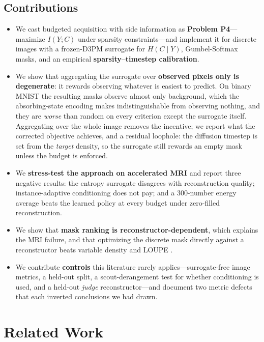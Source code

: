 \documentclass{article}
\begin{document}
\subsection{Contributions}
\begin{itemize}
\item We cast budgeted acquisition with side information as \textbf{Problem P4}---maximize $I(Y;C)$ under sparsity constraints---and implement it for discrete images with a frozen-D3PM surrogate for $H(C \mid Y)$, Gumbel-Softmax masks, and an empirical \textbf{sparsity--timestep calibration}.
\item We show that aggregating the surrogate over \textbf{observed pixels only is degenerate}: it rewards observing whatever is easiest to predict. On binary MNIST the resulting masks observe almost only background, which the absorbing-state encoding makes indistinguishable from observing nothing, and they are \emph{worse} than random on every criterion except the surrogate itself. Aggregating over the whole image removes the incentive; we report what the corrected objective achieves, and a residual loophole: the diffusion timestep is set from the \emph{target} density, so the surrogate still rewards an empty mask unless the budget is enforced.
\item We \textbf{stress-test the approach on accelerated MRI} and report three negative results: the entropy surrogate disagrees with reconstruction quality; instance-adaptive conditioning does not pay; and a 300-number energy average beats the learned policy at every budget under zero-filled reconstruction.
\item We show that \textbf{mask ranking is reconstructor-dependent}, which explains the MRI failure, and that optimizing the discrete mask directly against a reconstructor beats variable density and LOUPE \citep{bahadir2020loupe}.
\item We contribute \textbf{controls} this literature rarely applies---surrogate-free image metrics, a held-out split, a scout-derangement test for whether conditioning is used, and a held-out \emph{judge} reconstructor---and document two metric defects that each inverted conclusions we had drawn.
\end{itemize}

\section{Related Work}
\end{document}
